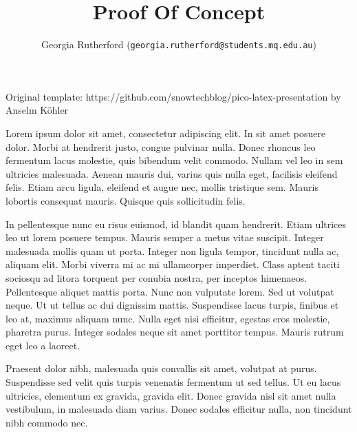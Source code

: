 \documentclass[unknownkeysallowed,usepdftitle=false, parskip=full]{beamer}
\title{Proof Of Concept}
\author{Georgia Rutherford (\texttt{georgia.rutherford@students.mq.edu.au})}
\institute{Macquarie University}
\newcommand{\secvariable}{nothing}
\newcommand{\mysection}[1]{\renewcommand{\secvariable}{#1}
}
\begin{document}
\mysection{abstract}
\begin{frame}\label{\secvariable}



\parbox{\linewidth}{

Original template: https://github.com/snowtechblog/pico-latex-presentation by Anselm Köhler


\vspace{12pt}

Lorem ipsum dolor sit amet, consectetur adipiscing elit. In sit amet posuere dolor. Morbi at hendrerit justo, congue pulvinar nulla. Donec rhoncus leo fermentum lacus molestie, quis bibendum velit commodo. Nullam vel leo in sem ultricies malesuada. Aenean mauris dui, varius quis nulla eget, facilisis eleifend felis. Etiam arcu ligula, eleifend et augue nec, mollis tristique sem. Mauris lobortis consequat mauris. Quisque quis sollicitudin felis.

 \vspace{12pt}
 
In pellentesque nunc eu risus euismod, id blandit quam hendrerit. Etiam ultrices leo ut lorem posuere tempus. Mauris semper a metus vitae suscipit. Integer malesuada mollis quam ut porta. Integer non ligula tempor, tincidunt nulla ac, aliquam elit. Morbi viverra mi ac mi ullamcorper imperdiet. Class aptent taciti sociosqu ad litora torquent per conubia nostra, per inceptos himenaeos. Pellentesque aliquet mattis porta. Nunc non vulputate lorem. Sed ut volutpat neque. Ut ut tellus ac dui dignissim mattis. Suspendisse lacus turpis, finibus et leo at, maximus aliquam nunc. Nulla eget nisi efficitur, egestas eros molestie, pharetra purus. Integer sodales neque sit amet porttitor tempus. Mauris rutrum eget leo a laoreet.

 \vspace{12pt}
 
Praesent dolor nibh, malesuada quis convallis sit amet, volutpat at purus. Suspendisse sed velit quis turpis venenatis fermentum ut sed tellus. Ut eu lacus ultricies, elementum ex gravida, gravida elit. Donec gravida nisl sit amet nulla vestibulum, in malesuada diam varius. Donec sodales efficitur nulla, non tincidunt nibh commodo nec. 
}


   
\end{frame}
\end{document}
